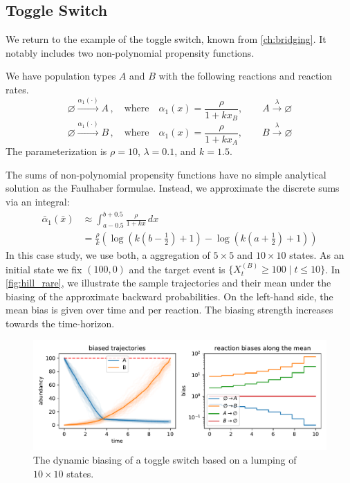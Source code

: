 \subsection{Toggle Switch}
We return to the example of the toggle switch, known from \autoref{ch:bridging}.
It notably includes two non-polynomial propensity functions.
\begin{model}\label{model:hill_toggle_rare}
We have population types $A$ and $B$ with the following reactions and reaction rates.
$$ \varnothing \xrightarrow{\alpha_1(\cdot)} A\,,\quad \text{where}\quad \alpha_1(x) = \frac{\rho}{1 + k x_B},
\qquad A \xrightarrow\lambda \varnothing $$
$$ \varnothing \xrightarrow{\alpha_1(\cdot)} B\,,\quad \text{where}\quad \alpha_1(x) = \frac{\rho}{1 + k x_A},
\qquad B \xrightarrow\lambda \varnothing $$
The parameterization is $\rho=10$, $\lambda=0.1$, and $k=1.5$.
\end{model}
The sums of non-polynomial propensity functions have no simple analytical solution as the Faulhaber formulae.
Instead, we approximate the discrete sums via an integral:
\[
\begin{split}
    \bar{\alpha}_1(\bar{x})&\approx\int_{a-0.5}^{b+0.5} \frac{\rho}{1 + kx}\, dx\\
    &= \frac{\rho}{k} \left(\log{\left(k\left(b - \frac{1}{2}\right) + 1\right)} - \log{\left(k\left(a + \frac{1}{2}\right) + 1 \right)} \right)
\end{split}
\]
In this case study, we use both, a aggregation of $5\times 5$ and $10\times10$ states.
As an initial state we fix $(100, 0)$ and the target event is
\(\{X_t^{(B)} \geq 100 \mid t\leq 10 \}\).
In \autoref{fig:hill_rare}, we illustrate the sample trajectories and their mean under the biasing of the approximate backward probabilities.
On the left-hand side, the mean bias is given over time and per reaction.
The biasing strength increases towards the time-horizon.
\begin{figure}[htb]
    \centering
    \includegraphics[width=\textwidth]{gfx/hill_toggle_is.pdf}
    \caption[Dynamic biasing for the toggle switch]{\label{fig:hill_rare}The dynamic biasing of a toggle switch based on a lumping of $10\times 10$ states.}
\end{figure}

